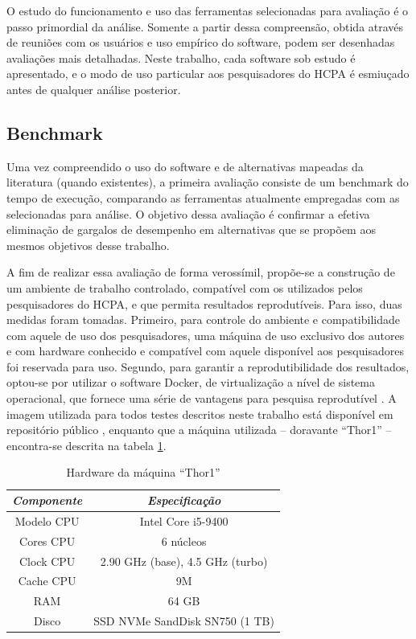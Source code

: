 \documentclass[cic,tc]{iiufrgs}
\begin{document}
O estudo do funcionamento e uso das ferramentas selecionadas para avaliação é o
passo primordial da análise. Somente a partir dessa compreensão, obtida através
de reuniões com os usuários e uso empírico do software, podem ser desenhadas
avaliações mais detalhadas. Neste trabalho, cada software sob estudo é
apresentado, e o modo de uso particular aos pesquisadores do HCPA é esmiuçado
antes de qualquer análise posterior.

\subsection{Benchmark}

Uma vez compreendido o uso do software e de alternativas mapeadas da literatura
(quando existentes), a primeira avaliação consiste de um benchmark do tempo de
execução, comparando as ferramentas atualmente empregadas com as selecionadas
para análise.
O objetivo dessa avaliação é confirmar a efetiva eliminação de gargalos de
desempenho em alternativas que se propõem aos mesmos objetivos desse trabalho.

A fim de realizar essa avaliação de forma verossímil, propõe-se a construção de
um ambiente de trabalho controlado, compatível com os utilizados pelos
pesquisadores do HCPA, e que permita resultados reprodutíveis. Para isso, duas
medidas foram tomadas. Primeiro, para controle do ambiente e compatibilidade
com aquele de uso dos pesquisadores, uma máquina de uso exclusivo dos autores e
com hardware conhecido e compatível com aquele disponível aos pesquisadores foi
reservada para uso. Segundo, para garantir a reprodutibilidade dos resultados,
optou-se por utilizar o software Docker, de virtualização a nível de sistema
operacional, que fornece uma série de vantagens para pesquisa
reprodutível \cite{boettiger2015introduction}. A imagem utilizada para todos
testes descritos neste trabalho está disponível em repositório
público \cite{dockerme}, enquanto que a máquina utilizada -- doravante ``Thor1''
-- encontra-se descrita na tabela \ref{tbl:thor1}.

\begin{table}[h]
    \caption{Hardware da máquina ``Thor1''}
    \centering
        \begin{tabular}{c|c}
          \hline
          \textit{Componente}  &   \textit{Especificação} \\
          \hline
          \hline
          Modelo CPU & Intel Core i5-9400 \\
          Cores CPU & 6 núcleos\\
          Clock CPU & 2.90 GHz (base), 4.5 GHz (turbo) \\
          Cache CPU & 9M \\
          RAM & 64 GB \\
          Disco & SSD NVMe SandDisk SN750 (1 TB) \\
          \hline
        \end{tabular}
    \label{tbl:thor1}
\end{table}
\end{document}
